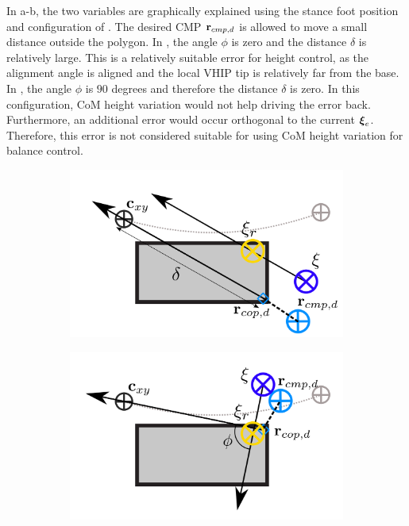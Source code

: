 In a-b, the two variables are graphically explained using the stance foot position and configuration of . The desired \ac{CMP} $\mathbf{r}_{cmp,d}$ is allowed to move a small distance outside the polygon. In , the angle $\phi$ is zero and the distance $\delta$ is relatively large. This is a relatively suitable error for height control, as the alignment angle is aligned and the local \ac{VHIP} tip is relatively far from the base. In , the angle $\phi$ is $90$ degrees and therefore the distance $\delta$ is zero. In this configuration, \ac{CoM} height variation would not help driving the error back. Furthermore, an additional error would occur orthogonal to the current $\boldsymbol{\xi}_e$. Therefore, this error is not considered suitable for using \ac{CoM} height variation for balance control.
\begin{figure}[h]
\centering
  \begin{subfigure}{0.49\textwidth}
    \centering
  \includegraphics[width=.7\linewidth]{STYLESTUFF/ICPplanStartSSPhiViz0.png}
    \caption{}
     \label{fig:phiVizc}
  \end{subfigure}
  \begin{subfigure}{0.49\textwidth}
    \centering
  \includegraphics[width=.7\linewidth]{STYLESTUFF/ICPplanStartSSPhiViz90.png}
    \caption{}
     \label{fig:phiVizd}
  \end{subfigure}
  \begin{subfigure}{0.49\textwidth}

\end{subfigure}
\end{figure}
